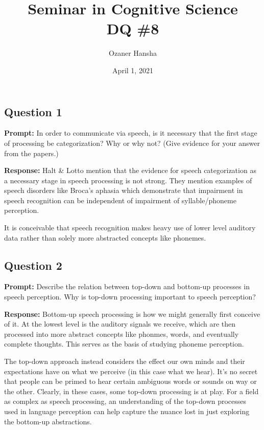 \documentclass{article}
\begin{document}
\title{Seminar in Cognitive Science\\ DQ \#8}
\author{Ozaner Hansha}
\date{April 1, 2021}
\maketitle

\subsection*{Question 1}
\noindent\textbf{Prompt:} In order to communicate via speech, is it necessary that the first stage of processing be categorization? Why or why not? (Give evidence for your answer from the papers.)
\bigskip

\noindent\textbf{Response:} Halt \& Lotto mention that the evidence for speech categorization as a necessary stage in speech processing is not strong. They mention examples of speech disorders like Broca's aphasia which demonstrate that impairment in speech recognition can be independent of impairment of syllable/phoneme perception.

It is conceivable that speech recognition makes heavy use of lower level auditory data rather than solely more abstracted concepts like phonemes.

\subsection*{Question 2}
\noindent\textbf{Prompt:} Describe the relation between top-down and bottom-up processes in speech perception. Why is top-down processing important to speech perception?
\bigskip

\noindent\textbf{Response:} Bottom-up speech processing is how we might generally first conceive of it. At the lowest level is the auditory signals we receive, which are then processed into more abstract concepts like phonmes, words, and eventually complete thoughts. This serves as the basis of studying phoneme perception.

The top-down approach instead considers the effect our own minds and their expectations have on what we perceive (in this case what we hear). It's no secret that people can be primed to hear certain ambiguous words or sounds on way or the other. Clearly, in these cases, some top-down processing is at play. For a field as complex as speech processing, an understanding of the top-down processes used in language perception can help capture the nuance lost in just exploring the bottom-up abstractions.
\end{document}
